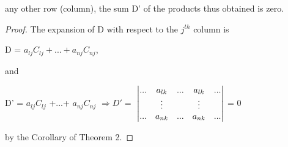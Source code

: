 \documentclass[11pt]{amsbook}
\begin{document}
any other row (column), the sum D' of the products thus obtained is zero.
\begin{proof}
	The expansion of D with respect to the $j^{th}$ column is  
	\begin{center}
		D = $ a_{lj}  C_{lj} + ...+ a_{nj} C_{nj}  $,
	\end{center}
	and
	\begin{center}
		D' = $ a_{lj} C_{lj} $ +...+ $  a_{nj} C_{nj}$  $ \Longrightarrow D' =$
		$\begin{vmatrix}
			... & a_{lk}&... & a_{lk}&...\\ 
    			& \vdots&    &\vdots&   \\
			...&a_{nk}&...&a_{nk}&...  \notag
		\end{vmatrix}$
		= 0
	\end{center}
by the Corollary of Theorem 2.
\end{proof}













\end{document}

